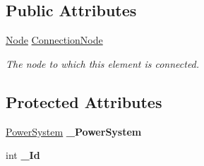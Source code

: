 \subsection*{Public Attributes}
\begin{DoxyCompactItemize}
\item 
\hyperlink{class_power_system_planning_1_1_node}{Node} \hyperlink{class_power_system_planning_1_1_node_element_ade5e2883dbd6d8676a8572c827f6b60a}{Connection\+Node}
\begin{DoxyCompactList}\small\item\em The node to which this element is connected. \end{DoxyCompactList}\end{DoxyCompactItemize}
\subsection*{Protected Attributes}
\begin{DoxyCompactItemize}
\item 
\hyperlink{class_power_system_planning_1_1_power_system}{Power\+System} {\bfseries \+\_\+\+Power\+System}\hypertarget{class_power_system_planning_1_1_node_element_a7ebfa39bd19233c8661b0a665dc6733e}{}\label{class_power_system_planning_1_1_node_element_a7ebfa39bd19233c8661b0a665dc6733e}

\item 
int {\bfseries \+\_\+\+Id}\hypertarget{class_power_system_planning_1_1_node_element_a9d8d503e705d7884c6a59bf59ce7b355}{}\label{class_power_system_planning_1_1_node_element_a9d8d503e705d7884c6a59bf59ce7b355}

\end{DoxyCompactItemize}
